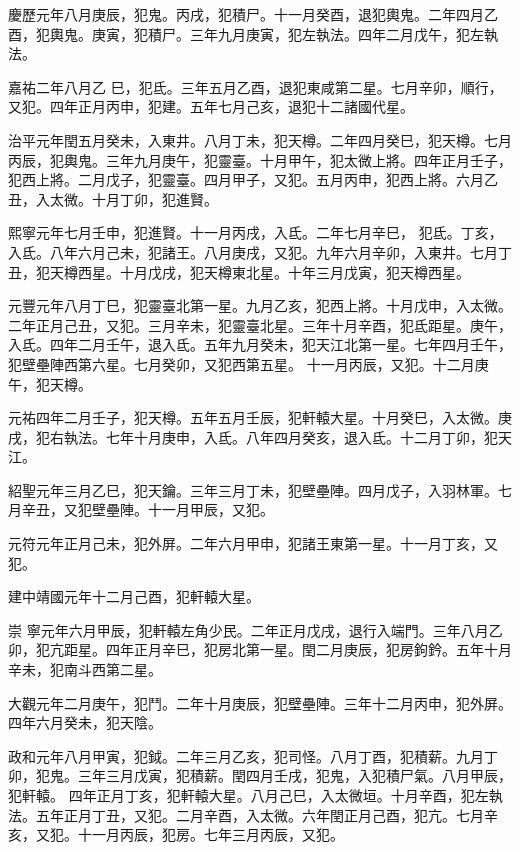\begin{pinyinscope}
 慶歷元年八月庚辰，犯鬼。丙戌，犯積尸。十一月癸酉，退犯輿鬼。二年四月乙酉，犯輿鬼。庚寅，犯積尸。三年九月庚寅，犯左執法。四年二月戊午，犯左執法。



 嘉祐二年八月乙
 巳，犯氐。三年五月乙酉，退犯東咸第二星。七月辛卯，順行，又犯。四年正月丙申，犯建。五年七月己亥，退犯十二諸國代星。



 治平元年閏五月癸未，入東井。八月丁未，犯天樽。二年四月癸巳，犯天樽。七月丙辰，犯輿鬼。三年九月庚午，犯靈臺。十月甲午，犯太微上將。四年正月壬子，犯西上將。二月戊子，犯靈臺。四月甲子，又犯。五月丙申，犯西上將。六月乙丑，入太微。十月丁卯，犯進賢。



 熙寧元年七月壬申，犯進賢。十一月丙戌，入氐。二年七月辛巳，
 犯氐。丁亥，入氐。八年六月己未，犯諸王。八月庚戌，又犯。九年六月辛卯，入東井。七月丁丑，犯天樽西星。十月戊戌，犯天樽東北星。十年三月戊寅，犯天樽西星。



 元豐元年八月丁巳，犯靈臺北第一星。九月乙亥，犯西上將。十月戊申，入太微。二年正月己丑，又犯。三月辛未，犯靈臺北星。三年十月辛酉，犯氐距星。庚午，入氐。四年二月壬午，退入氐。五年九月癸未，犯天江北第一星。七年四月壬午，犯壁壘陣西第六星。七月癸卯，又犯西第五星。
 十一月丙辰，又犯。十二月庚午，犯天樽。



 元祐四年二月壬子，犯天樽。五年五月壬辰，犯軒轅大星。十月癸巳，入太微。庚戌，犯右執法。七年十月庚申，入氐。八年四月癸亥，退入氐。十二月丁卯，犯天江。



 紹聖元年三月乙巳，犯天鑰。三年三月丁未，犯壁壘陣。四月戊子，入羽林軍。七月辛丑，又犯壁壘陣。十一月甲辰，又犯。



 元符元年正月己未，犯外屏。二年六月甲申，犯諸王東第一星。十一月丁亥，又犯。



 建中靖國元年十二月己酉，犯軒轅大星。



 崇
 寧元年六月甲辰，犯軒轅左角少民。二年正月戊戌，退行入端門。三年八月乙卯，犯亢距星。四年正月辛巳，犯房北第一星。閏二月庚辰，犯房鉤鈐。五年十月辛未，犯南斗西第二星。



 大觀元年二月庚午，犯鬥。二年十月庚辰，犯壁壘陣。三年十二月丙申，犯外屏。四年六月癸未，犯天陰。



 政和元年八月甲寅，犯鉞。二年三月乙亥，犯司怪。八月丁酉，犯積薪。九月丁卯，犯鬼。三年三月戊寅，犯積薪。閏四月壬戌，犯鬼，入犯積尸氣。八月甲辰，犯軒轅。
 四年正月丁亥，犯軒轅大星。八月己巳，入太微垣。十月辛酉，犯左執法。五年正月丁丑，又犯。二月辛酉，入太微。六年閏正月己酉，犯亢。七月辛亥，又犯。十一月丙辰，犯房。七年三月丙辰，又犯。




\end{pinyinscope}
